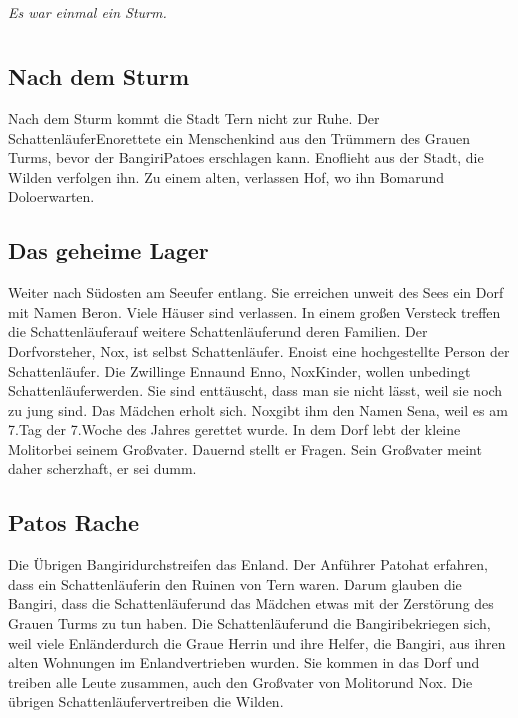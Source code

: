 \documentclass[12pt,a4paper,onecolumn,twoside,ngerman]{book}
\newcommand{\Tern}{Tern }
\newcommand{\Beron}{Beron}
\newcommand{\Molitor}{Molitor}
\newcommand{\Sena}{Sena}
\newcommand{\Bangiri}{Bangiri}
\newcommand{\Pato}{Pato}
\newcommand{\Enland}{Enland}
\newcommand{\Enlaender}{Enländer}
\newcommand{\Schattenlaufer}{Schattenläufer}
\newcommand{\Eno}{Eno}
\newcommand{\Bomar}{Bomar}
\newcommand{\Dolo}{Dolo}
\newcommand{\Nox}{Nox}
\newcommand{\Enna}{Enna}
\newcommand{\Enno}{Enno}
\begin{document}
  
  
  
  \tableofcontents
  


\paragraph{}
\textit{Es war einmal ein Sturm.}

\chapter{}
\section{Nach dem Sturm}
Nach dem Sturm kommt die Stadt \Tern nicht zur Ruhe.
Der \Schattenlaufer \Eno rettete ein Menschenkind aus den Trümmern des Grauen Turms, bevor der \Bangiri \Pato es erschlagen kann. \Eno flieht aus der Stadt, die Wilden verfolgen ihn. Zu einem alten, verlassen Hof, wo ihn \Bomar und \Dolo erwarten. 

\section{Das geheime Lager}
Weiter nach Südosten am Seeufer entlang. Sie erreichen unweit des Sees ein Dorf mit Namen \Beron{.} Viele Häuser sind verlassen. In einem großen Versteck treffen die \Schattenlaufer auf weitere \Schattenlaufer und deren Familien. Der Dorfvorsteher, \Nox{,} ist selbst \Schattenlaufer{.} \Eno ist eine hochgestellte Person der \Schattenlaufer. 
Die Zwillinge \Enna und \Enno , \Nox Kinder, wollen unbedingt \Schattenlaufer werden. Sie sind enttäuscht, dass man sie nicht lässt, weil sie noch zu jung sind. Das Mädchen erholt sich. \Nox gibt ihm den Namen \Sena, weil es am 7.Tag der 7.Woche des Jahres gerettet wurde.
In dem Dorf lebt der kleine \Molitor bei seinem Großvater. Dauernd stellt er Fragen. Sein Großvater meint daher scherzhaft, er sei dumm.

\section{\Pato{s} Rache}
Die Übrigen \Bangiri durchstreifen das \Enland . Der Anführer \Pato hat erfahren, dass ein \Schattenlaufer in den Ruinen von \Tern waren. Darum glauben die \Bangiri{,} dass die \Schattenlaufer und das Mädchen etwas mit der Zerstörung des Grauen Turms zu tun haben. Die \Schattenlaufer und die \Bangiri bekriegen sich, weil viele \Enlaender durch die Graue Herrin und ihre Helfer, die \Bangiri , aus ihren alten Wohnungen im \Enland vertrieben wurden. 
Sie kommen in das Dorf und treiben alle Leute zusammen, auch den Großvater von \Molitor und \Nox{.}
Die übrigen \Schattenlaufer vertreiben die Wilden.
\end{document}
